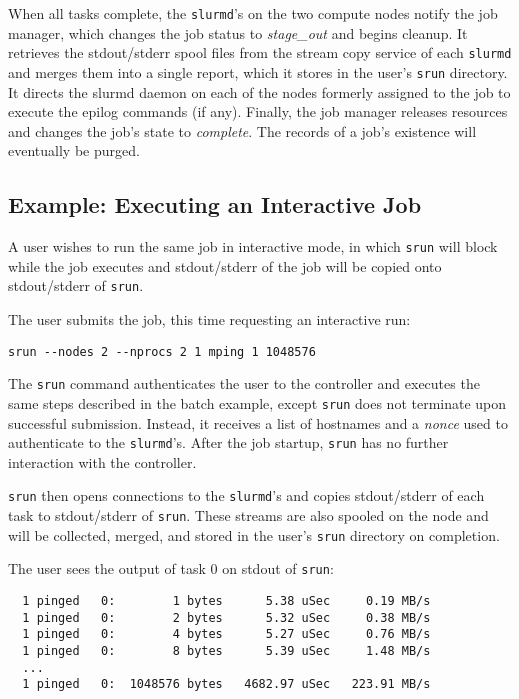 When all tasks complete, the {\tt slurmd}'s on the two compute nodes notify
the job manager, which changes the job status to {\em stage\_out} and begins cleanup.
It retrieves the stdout/stderr spool files from the stream copy service
of each {\tt slurmd} and merges them into a single report, 
which it stores in the user's {\tt srun} directory.
It directs the slurmd daemon on each of the nodes formerly assigned to the 
job to execute the epilog commands (if any).
Finally, the job manager releases resources and changes the job's state to 
{\em complete}. The records of a job's existence will eventually be purged.


\subsection{Example:  Executing an Interactive Job}

A user wishes to run the same job in interactive mode, in which {\tt srun}
will block while the job executes and stdout/stderr of the job will be 
copied onto stdout/stderr of {\tt srun}.

The user submits the job, this time requesting an interactive run:
\begin{verbatim}
srun --nodes 2 --nprocs 2 1 mping 1 1048576
\end{verbatim}

The {\tt srun} command authenticates the user to the controller and 
executes the same steps described in the batch example, except {\tt srun} 
does not terminate upon successful submission.  Instead, it receives a list of
hostnames and a {\em nonce} used to authenticate to the {\tt slurmd}'s.
After the job startup, {\tt srun} has no further interaction with the 
controller.

{\tt srun} then opens connections to the {\tt slurmd}'s and copies 
stdout/stderr of each task to stdout/stderr of {\tt srun}.  These streams
are also spooled on the node and will be collected, merged, and stored
in the user's {\tt srun} directory on completion.

The user sees the output of task 0 on stdout of {\tt srun}:

\begin{verbatim}
  1 pinged   0:        1 bytes      5.38 uSec     0.19 MB/s                     
  1 pinged   0:        2 bytes      5.32 uSec     0.38 MB/s                     
  1 pinged   0:        4 bytes      5.27 uSec     0.76 MB/s                     
  1 pinged   0:        8 bytes      5.39 uSec     1.48 MB/s                     
  ...
  1 pinged   0:  1048576 bytes   4682.97 uSec   223.91 MB/s              
\end{verbatim}


